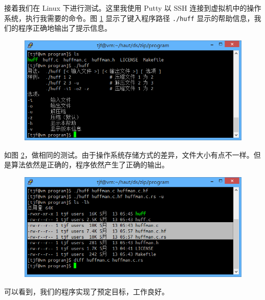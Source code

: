 \clearpage

接着我们在 Linux 下进行测试。这里我使用 Putty 以 SSH 连接到虚拟机中的操作系统，执行我需要的命令。图 \ref{linux_huff} 显示了键入程序路径 \verb|./huff| 显示的帮助信息，我们的程序正确地输出了提示信息。

\begin{figure}[htp]
\includegraphics[width=\textwidth]{image/linux_huff.png}
\caption{\label{linux_huff}}
\end{figure}

如图 \ref{linux_test}，做相同的测试。由于操作系统存储方式的差异，文件大小有点不一样。但是算法依然是正确的，程序依然产生了正确的输出。

\begin{figure}[htp]
\includegraphics[width=\textwidth]{image/linux_test.png}
\caption{\label{linux_test}}
\end{figure}

可以看到，我们的程序实现了预定目标，工作良好。
